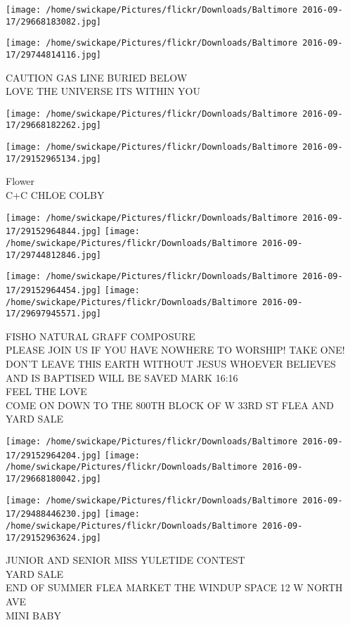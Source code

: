 \documentclass[10pt,letterpaper]{article}
\begin{document}
\texttt{[image: /home/swickape/Pictures/flickr/Downloads/Baltimore 2016-09-17/29668183082.jpg]}

\vspace{0.25in}
\texttt{[image: /home/swickape/Pictures/flickr/Downloads/Baltimore 2016-09-17/29744814116.jpg]}

CAUTION GAS LINE BURIED BELOW\\
LOVE THE UNIVERSE ITS WITHIN YOU
\pagebreak

\texttt{[image: /home/swickape/Pictures/flickr/Downloads/Baltimore 2016-09-17/29668182262.jpg]}

\vspace{0.25in}
\texttt{[image: /home/swickape/Pictures/flickr/Downloads/Baltimore 2016-09-17/29152965134.jpg]}

Flower\\
C+C CHLOE COLBY
\pagebreak

\texttt{[image: /home/swickape/Pictures/flickr/Downloads/Baltimore 2016-09-17/29152964844.jpg]}
\texttt{[image: /home/swickape/Pictures/flickr/Downloads/Baltimore 2016-09-17/29744812846.jpg]}

\texttt{[image: /home/swickape/Pictures/flickr/Downloads/Baltimore 2016-09-17/29152964454.jpg]}
\texttt{[image: /home/swickape/Pictures/flickr/Downloads/Baltimore 2016-09-17/29697945571.jpg]}

FISHO NATURAL GRAFF COMPOSURE\\
PLEASE JOIN US IF YOU HAVE NOWHERE TO WORSHIP!  TAKE ONE!  DON'T LEAVE THIS EARTH WITHOUT JESUS WHOEVER BELIEVES AND IS BAPTISED WILL BE SAVED MARK 16:16\\
FEEL THE LOVE\\
COME ON DOWN TO THE 800TH BLOCK OF W 33RD ST FLEA AND YARD SALE
\pagebreak

\texttt{[image: /home/swickape/Pictures/flickr/Downloads/Baltimore 2016-09-17/29152964204.jpg]}
\texttt{[image: /home/swickape/Pictures/flickr/Downloads/Baltimore 2016-09-17/29668180042.jpg]}

\texttt{[image: /home/swickape/Pictures/flickr/Downloads/Baltimore 2016-09-17/29488446230.jpg]}
\texttt{[image: /home/swickape/Pictures/flickr/Downloads/Baltimore 2016-09-17/29152963624.jpg]}

JUNIOR AND SENIOR MISS YULETIDE CONTEST\\
YARD SALE\\
END OF SUMMER FLEA MARKET THE WINDUP SPACE 12 W NORTH AVE\\
MINI BABY
\pagebreak
\end{document}
